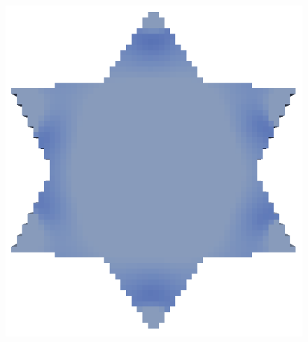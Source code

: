 \begin{frame}
\begin{minipage}{0.85\textwidth}
{\begin{figure}
			\includegraphics[scale=0.15]{Pictures/TopOp/Star_Optimized0_Trans.png}
			\end{figure}
			}
\end{minipage}
\end{frame}
